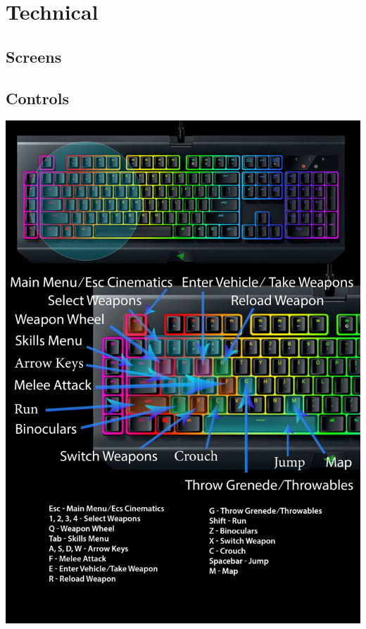 \section{Technical}
    \subsection{Screens}
    \subsection{Controls}
        \includegraphics[width=\linewidth]{images/keyboard_layout.png} \newpage
